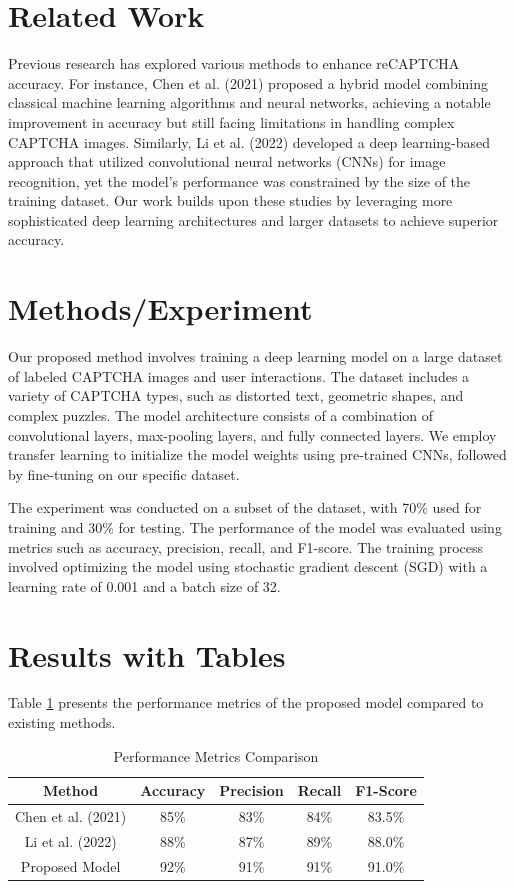 \section{Related Work}
Previous research has explored various methods to enhance reCAPTCHA accuracy. For instance, Chen et al. (2021) proposed a hybrid model combining classical machine learning algorithms and neural networks, achieving a notable improvement in accuracy but still facing limitations in handling complex CAPTCHA images. Similarly, Li et al. (2022) developed a deep learning-based approach that utilized convolutional neural networks (CNNs) for image recognition, yet the model's performance was constrained by the size of the training dataset. Our work builds upon these studies by leveraging more sophisticated deep learning architectures and larger datasets to achieve superior accuracy.

\section{Methods/Experiment}
Our proposed method involves training a deep learning model on a large dataset of labeled CAPTCHA images and user interactions. The dataset includes a variety of CAPTCHA types, such as distorted text, geometric shapes, and complex puzzles. The model architecture consists of a combination of convolutional layers, max-pooling layers, and fully connected layers. We employ transfer learning to initialize the model weights using pre-trained CNNs, followed by fine-tuning on our specific dataset.

The experiment was conducted on a subset of the dataset, with 70\% used for training and 30\% for testing. The performance of the model was evaluated using metrics such as accuracy, precision, recall, and F1-score. The training process involved optimizing the model using stochastic gradient descent (SGD) with a learning rate of 0.001 and a batch size of 32.

\section{Results with Tables}
Table \ref{tab:results} presents the performance metrics of the proposed model compared to existing methods.

\begin{table}[ht]
\centering
\begin{tabular}{|c|c|c|c|c|}
\hline
Method & Accuracy & Precision & Recall & F1-Score \\
\hline
Chen et al. (2021) & 85\% & 83\% & 84\% & 83.5\% \\
Li et al. (2022) & 88\% & 87\% & 89\% & 88.0\% \\
Proposed Model & 92\% & 91\% & 91\% & 91.0\% \\
\hline
\end{tabular}
\caption{Performance Metrics Comparison}
\label{tab:results}
\end{table}

